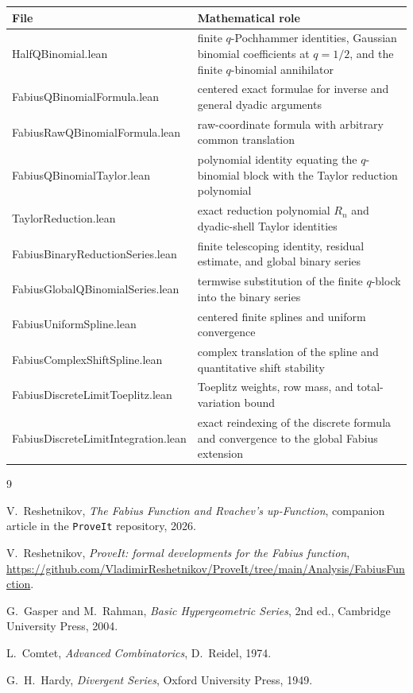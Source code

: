 \documentclass[11pt,oneside]{article}
\theoremstyle{definition}
\theoremstyle{remark}
\begin{document}
\begin{center}
\renewcommand{\arraystretch}{1.16}
\begin{tabularx}{0.96\textwidth}{>{\ttfamily\raggedright\arraybackslash}p{}X}
\toprule
\normalfont File & Mathematical role\\
\midrule
HalfQBinomial.lean
 & finite $q$-Pochhammer identities, Gaussian binomial coefficients at
   $q=1/2$, and the finite $q$-binomial annihilator\\
FabiusQBinomialFormula.lean
 & centered exact formulae for inverse and general dyadic arguments\\
FabiusRawQBinomialFormula.lean
 & raw-coordinate formula with arbitrary common translation\\
FabiusQBinomialTaylor.lean
 & polynomial identity equating the $q$-binomial block with the Taylor
   reduction polynomial\\
TaylorReduction.lean
 & exact reduction polynomial $R_n$ and dyadic-shell Taylor identities\\
FabiusBinaryReductionSeries.lean
 & finite telescoping identity, residual estimate, and global binary series\\
FabiusGlobalQBinomialSeries.lean
 & termwise substitution of the finite $q$-block into the binary series\\
FabiusUniformSpline.lean
 & centered finite splines and uniform convergence\\
FabiusComplexShiftSpline.lean
 & complex translation of the spline and quantitative shift stability\\
FabiusDiscreteLimitToeplitz.lean
 & Toeplitz weights, row mass, and total-variation bound\\
FabiusDiscreteLimitIntegration.lean
 & exact reindexing of the discrete formula and convergence to the global
   Fabius extension\\
\bottomrule
\end{tabularx}
\end{center}

\begin{thebibliography}{9}

V.~Reshetnikov,
\emph{The Fabius Function and Rvachev's up-Function},
companion article in the \texttt{ProveIt} repository, 2026.

V.~Reshetnikov,
\emph{ProveIt: formal developments for the Fabius function},
\url{https://github.com/VladimirReshetnikov/ProveIt/tree/main/Analysis/FabiusFunction}.

G.~Gasper and M.~Rahman,
\emph{Basic Hypergeometric Series}, 2nd ed.,
Cambridge University Press, 2004.

L.~Comtet,
\emph{Advanced Combinatorics},
D.~Reidel, 1974.

G.~H.~Hardy,
\emph{Divergent Series},
Oxford University Press, 1949.

\end{thebibliography}
\end{document}
